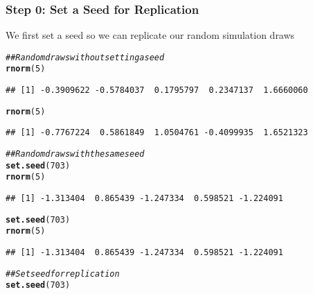 \documentclass{beamer}\usepackage[]{graphicx}\usepackage[]{xcolor}
\makeatletter
\newcommand{\hlnum}[1]{\textcolor[rgb]{0.686,0.059,0.569}{#1}}%
\newcommand{\hlcom}[1]{\textcolor[rgb]{0.678,0.584,0.686}{\textit{#1}}}%
\newcommand{\hlstd}[1]{\textcolor[rgb]{0.345,0.345,0.345}{#1}}%
\newcommand{\hlkwd}[1]{\textcolor[rgb]{0.737,0.353,0.396}{\textbf{#1}}}%
\newenvironment{kframe}{%
 \def\at@end@of@kframe{}%
 \ifinner\ifhmode%
  \def\at@end@of@kframe{\end{minipage}}%
  \begin{minipage}{\columnwidth}%
 \fi\fi%
 \def\FrameCommand##1{\hskip\@totalleftmargin \hskip-\fboxsep
 \colorbox{shadecolor}{##1}\hskip-\fboxsep
     \hskip-\linewidth \hskip-\@totalleftmargin \hskip\columnwidth}%
 \MakeFramed {\advance\hsize-\width
   \@totalleftmargin\z@ \linewidth\hsize
   \@setminipage}}%
 {\par\unskip\endMakeFramed%
 \at@end@of@kframe}
\newenvironment{knitrout}{}{} %
\makeatother
\begin{document}
\begin{frame}[fragile]\frametitle{Step 0: Set a Seed for Replication}
	We first set a seed so we can replicate our random simulation draws 
    \vspace{1ex}
\begin{knitrout}\footnotesize
{}\color{fgcolor}\begin{kframe}
\begin{alltt}
\hlcom{## Random draws without setting a seed}
\hlkwd{rnorm}\hlstd{(}\hlnum{5}\hlstd{)}
\end{alltt}
\begin{verbatim}
## [1] -0.3909622 -0.5784037  0.1795797  0.2347137  1.6660060
\end{verbatim}
\begin{alltt}
\hlkwd{rnorm}\hlstd{(}\hlnum{5}\hlstd{)}
\end{alltt}
\begin{verbatim}
## [1] -0.7767224  0.5861849  1.0504761 -0.4099935  1.6521323
\end{verbatim}
\begin{alltt}
\hlcom{## Random draws with the same seed}
\hlkwd{set.seed}\hlstd{(}\hlnum{703}\hlstd{)}
\hlkwd{rnorm}\hlstd{(}\hlnum{5}\hlstd{)}
\end{alltt}
\begin{verbatim}
## [1] -1.313404  0.865439 -1.247334  0.598521 -1.224091
\end{verbatim}
\begin{alltt}
\hlkwd{set.seed}\hlstd{(}\hlnum{703}\hlstd{)}
\hlkwd{rnorm}\hlstd{(}\hlnum{5}\hlstd{)}
\end{alltt}
\begin{verbatim}
## [1] -1.313404  0.865439 -1.247334  0.598521 -1.224091
\end{verbatim}
\begin{alltt}
\hlcom{## Set seed for replication}
\hlkwd{set.seed}\hlstd{(}\hlnum{703}\hlstd{)}
\end{alltt}
\end{kframe}
\end{knitrout}
\end{frame}
\end{document}
